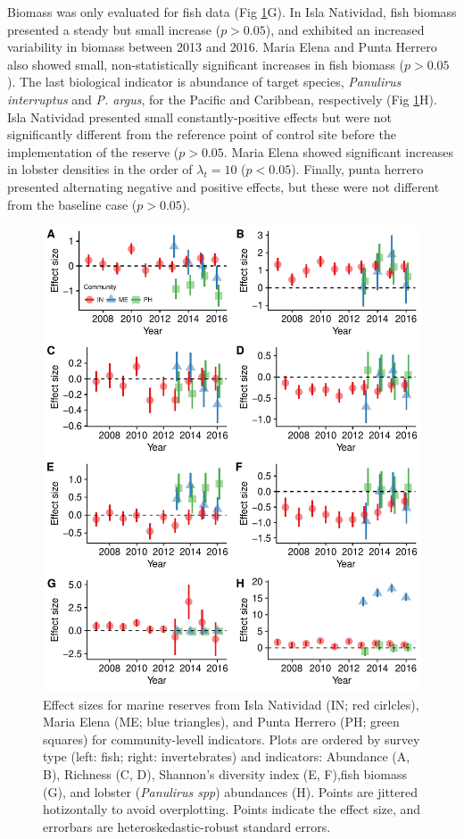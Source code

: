 \documentclass{frontiersSCNS}
\theoremstyle{definition}
\theoremstyle{definition}
\theoremstyle{definition}
\theoremstyle{remark}
\begin{document}
Biomass was only evaluated for fish data (Fig \ref{fig:indicators}G). In
Isla Natividad, fish biomass presented a steady but small increase
(\(p>0.05\)), and exhibited an increased variability in biomass between
2013 and 2016. Maria Elena and Punta Herrero also showed small,
non-statistically significant increases in fish biomass (\(p>0.05\)).
The last biological indicator is abundance of target species,
\emph{Panulirus interruptus} and \emph{P. argus}, for the Pacific and
Caribbean, respectively (Fig \ref{fig:indicators}H). Isla Natividad
presented small constantly-positive effects but were not significantly
different from the reference point of control site before the
implementation of the reserve (\(p > 0.05\). Maria Elena showed
significant increases in lobster densities in the order of
\(\lambda_t = 10\) (\(p < 0.05\)). Finally, punta herrero presented
alternating negative and positive effects, but these were not different
from the baseline case (\(p > 0.05\)).

\begin{figure}
\centering
\includegraphics{Villasenor-Derbez_files/figure-latex/unnamed-chunk-4-1.pdf}
\caption{\label{fig:unnamed-chunk-4}\label{fig:indicators}Effect sizes for
marine reserves from Isla Natividad (IN; red cirlcles), Maria Elena (ME;
blue triangles), and Punta Herrero (PH; green squares) for
community-levell indicators. Plots are ordered by survey type (left:
fish; right: invertebrates) and indicators: Abundance (A, B), Richness
(C, D), Shannon's diversity index (E, F),fish biomass (G), and lobster
(\emph{Panulirus spp}) abundances (H). Points are jittered hotizontally
to avoid overplotting. Points indicate the effect size, and errorbars
are heteroskedastic-robust standard errors.}
\end{figure}
\end{document}
